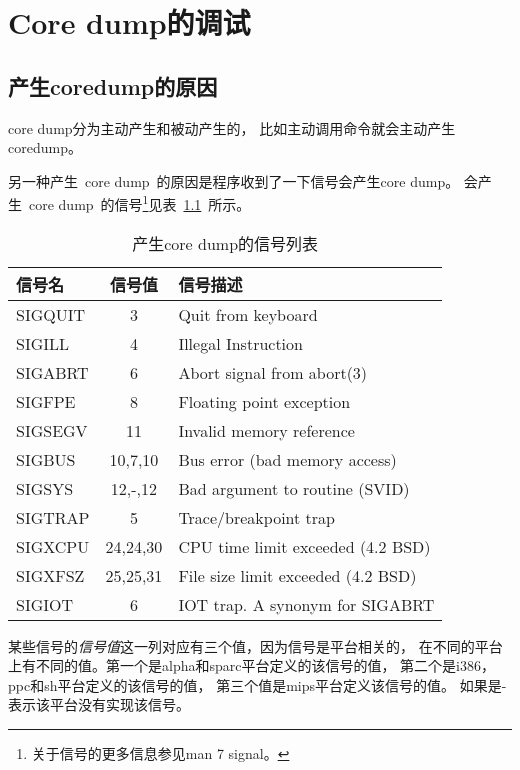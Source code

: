 
\chapter{Core dump的调试}
\label{ch:coredump}

\section{产生coredump的原因}

core dump分为主动产生和被动产生的，
比如主动调用命令就会主动产生coredump。

另一种产生~core dump~的原因是程序收到了一下信号会产生core dump。
会产生~core dump~的信号\footnote{关于信号的更多信息参见man 7 signal。}见表~\ref{sec:tab_core_signals}~所示。

\begin{table}[!hbp]
\caption{产生core dump的信号列表} \label{sec:tab_core_signals}
\begin{tabular}{l|c|l}
\hline
信号名 & 信号值 & 信号描述 \\
\hline
SIGQUIT &    3	&	Quit from keyboard \\
SIGILL  &    4	&	Illegal Instruction \\
SIGABRT &    6	&	Abort signal from abort(3) \\
SIGFPE  &    8	&	Floating point exception \\
SIGSEGV &    11	&	Invalid memory reference \\
SIGBUS  &    10,7,10 &	Bus error (bad memory access) \\
SIGSYS  &    12,-,12 &	Bad argument to routine (SVID) \\
SIGTRAP &    5	&	Trace/breakpoint trap \\
SIGXCPU &    24,24,30 & CPU time limit exceeded (4.2 BSD) \\
SIGXFSZ &    25,25,31 & File size limit exceeded (4.2 BSD) \\
SIGIOT  &    6	&	IOT trap. A synonym for SIGABRT \\
\hline
\end{tabular}
\end{table}

某些信号的\emph{信号值}这一列对应有三个值，因为信号是平台相关的，
在不同的平台上有不同的值。第一个是alpha和sparc平台定义的该信号的值，
第二个是i386，ppc和sh平台定义的该信号的值，
第三个值是mips平台定义该信号的值。
如果是-表示该平台没有实现该信号。

